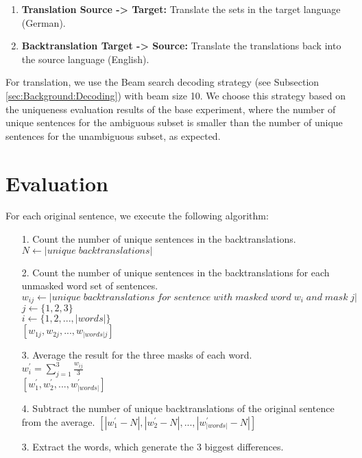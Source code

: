 \begin{enumerate}
    \item \textbf{Translation Source -> Target:} Translate the sets in the target language (German).
    \item \textbf{Backtranslation Target -> Source:} Translate the translations back into the source language (English).
\end{enumerate}

For translation, we use the Beam search decoding strategy (see Subsection \ref{sec:Background:Decoding}) with beam size 10. We choose this strategy based on the uniqueness evaluation results of the base experiment, where the number of unique sentences for the ambiguous subset is smaller than the number of unique sentences for the unambiguous subset, as expected.

\section{Evaluation}
\label{sec:Real_Experiment:Evaluation}

For each original sentence, we execute the following algorithm:
\begin{enumerate}
    \item[1. ] Count the number of unique sentences in the backtranslations. \\
    $N \leftarrow |unique \; backtranslations|$ 
    \item[2. ] Count the number of unique sentences in the backtranslations for each unmasked word set of sentences. \\
    $w_{ij} \leftarrow |unique \; backtranslations \; for \; sentence \; with \; masked \; word \; w_{i} \; and \; mask \; j|$ \\
    $j \leftarrow \{1, 2, 3\}$ \\
    $i \leftarrow \{1, 2, ..., |words|\}$ \\
    $[w_{1j}, w_{2j}, ..., w_{|words|j}]$
    \item[3. ] Average the result for the three masks of each word. \\ 
    $w_{i}^{'} = \sum_{j=1}^{3} \frac{w_{ij}}{3} $ \\
    $[w_{1}^{'}, w_{2}^{'}, ..., w_{|words|}^{'}]$
    \item[4. ] Subtract the number of unique backtranslations of the original sentence from the average.
    $[|w_{1}^{'} - N|, |w_{2}^{'} - N|, ..., |w_{|words|}^{'} - N|]$ 
    \item[3.] Extract the words, which generate the 3 biggest differences. 
    
\end{enumerate}


